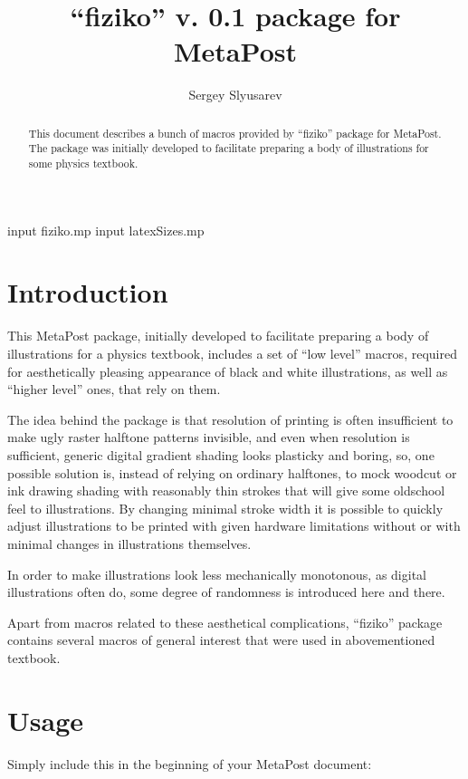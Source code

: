 \documentclass{article}
\author{Sergey Slyusarev}
\title{``fiziko'' v. 0.1 package for MetaPost }
\begin{document}
\begin{empfile}

\begin{empcmds}
input fiziko.mp
input latexSizes.mp
\end{empcmds}

\maketitle

\begin{abstract}
This document describes a bunch of macros provided by ``fiziko'' package for MetaPost. The package was initially developed to facilitate preparing a body of illustrations for some physics textbook. 
\end{abstract}

\tableofcontents

\section{Introduction}
This MetaPost package, initially developed to facilitate preparing a body of illustrations for a physics textbook, includes a set of ``low level'' macros, required for aesthetically pleasing appearance of black and white illustrations, as well as ``higher level'' ones, that rely on them.

The idea behind the package is that resolution of printing is often insufficient to make ugly raster halftone patterns invisible, and even when resolution is sufficient, generic digital gradient shading looks plasticky and boring, so, one possible solution is, instead of relying on ordinary halftones, to mock woodcut or ink drawing shading with reasonably thin strokes that will give some oldschool feel to illustrations. By changing minimal stroke width it is possible to quickly adjust illustrations to be printed with given hardware limitations without or with minimal changes in illustrations themselves. 

In order to make illustrations look less mechanically monotonous, as digital illustrations often do, some degree of randomness is introduced here and there.

Apart from macros related to these aesthetical complications, ``fiziko'' package contains several macros of general interest that were used in abovementioned textbook.

\section{Usage}
Simply include this in the beginning of your MetaPost document:


\end{empfile}
\end{document}
